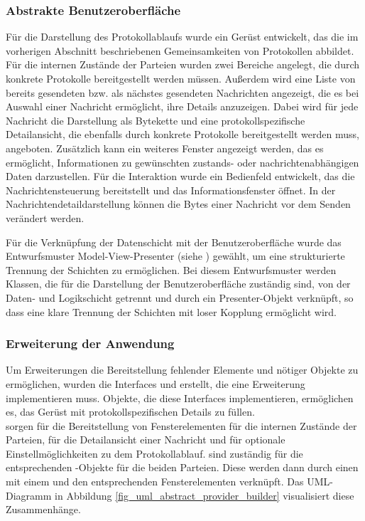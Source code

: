\subsubsection{Abstrakte Benutzeroberfläche}
Für die Darstellung des Protokollablaufs wurde ein Gerüst entwickelt, das die im vorherigen Abschnitt beschriebenen Gemeinsamkeiten von Protokollen abbildet. Für die internen Zustände der Parteien wurden zwei Bereiche angelegt, die durch konkrete Protokolle bereitgestellt werden müssen. Außerdem wird eine Liste von bereits gesendeten bzw. als nächstes gesendeten Nachrichten angezeigt, die es  bei Auswahl einer Nachricht ermöglicht, ihre Details anzuzeigen. Dabei wird für jede Nachricht die Darstellung als Bytekette und eine protokollspezifische Detailansicht, die ebenfalls durch konkrete Protokolle bereitgestellt werden muss, angeboten. Zusätzlich kann ein weiteres Fenster angezeigt werden, das es ermöglicht, Informationen zu gewünschten zustands- oder nachrichtenabhängigen Daten darzustellen. Für die Interaktion wurde ein Bedienfeld entwickelt, das die Nachrichtensteuerung bereitstellt und das Informationsfenster öffnet. In der Nachrichtendetaildarstellung können die Bytes einer Nachricht vor dem Senden verändert werden.

Für die Verknüpfung der Datenschicht mit der Benutzeroberfläche wurde das Entwurfsmuster Model-View-Presenter (siehe \cite{potel96}) gewählt, um eine strukturierte Trennung der Schichten zu ermöglichen. Bei diesem Entwurfsmuster werden Klassen, die für die Darstellung der Benutzeroberfläche zuständig sind, von der Daten- und Logikschicht getrennt und durch ein Presenter-Objekt verknüpft, so dass eine klare Trennung der Schichten mit loser Kopplung ermöglicht wird. 

\subsubsection{Erweiterung der Anwendung}
Um Erweiterungen die Bereitstellung fehlender Elemente und nötiger Objekte zu ermöglichen, wurden die Interfaces  und  erstellt, die eine Erweiterung implementieren muss. Objekte, die diese Interfaces implementieren, ermöglichen es, das Gerüst mit protokollspezifischen Details zu füllen.\\
 sorgen für die Bereitstellung von Fensterelementen für die internen Zustände der Parteien, für die Detailansicht einer Nachricht und für optionale Einstellmöglichkeiten zu dem Protokollablauf.  sind zuständig für die entsprechenden -Objekte für die beiden Parteien. Diese werden dann durch einen  mit einem  und den entsprechenden Fensterelementen verknüpft. Das UML-Diagramm in Abbildung \ref{fig_uml_abstract_provider_builder} visualisiert diese Zusammenhänge. 

